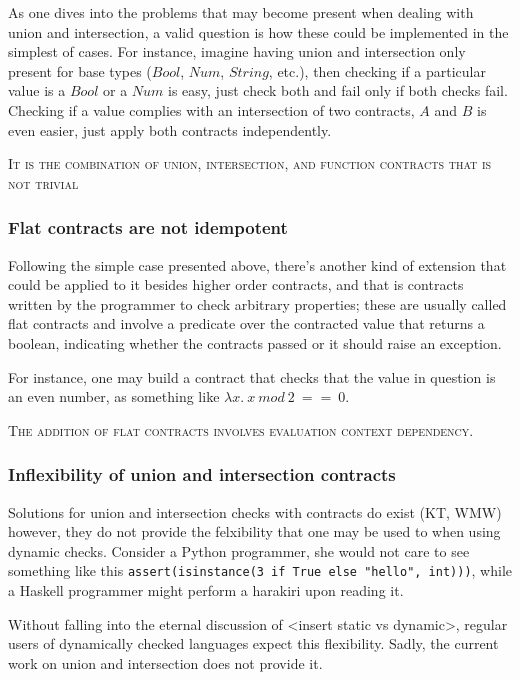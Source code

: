 As one dives into the problems that may become present when dealing with union and intersection,
a valid question is how these could be implemented in the simplest of cases.
For instance, imagine having
union and intersection only present for base types ($Bool$, $Num$, $String$, etc.), then checking
if a particular value is a $Bool$ or a $Num$ is easy, just check both and fail only if both 
checks fail. Checking if a value complies with an intersection of two contracts, $A$ and $B$ is even
easier, just apply both contracts independently.

\textsc{It is the combination of union, intersection, and function contracts that is not trivial}

\subsubsection*{Flat contracts are not idempotent}

Following the simple case presented above, there's another kind of extension that could be
applied to it besides higher order contracts, and that is contracts written by the
programmer to check arbitrary properties; these are usually called flat contracts and
involve a predicate over the contracted value that returns a boolean, indicating whether
the contracts passed or it should raise an exception.

For instance, one may build a contract that checks that the value in question is an
even number, as something like $\lambda x.~x~mod~2~==~0$.


\textsc{The addition of flat contracts involves evaluation context dependency.}

\subsubsection*{Inflexibility of union and intersection contracts}

Solutions for union and intersection checks with contracts do exist (KT, WMW) however,
they do not provide the felxibility that one may be used to when using dynamic checks.
Consider a Python programmer, she would not care to see something like this
\texttt{assert(isinstance(3 if True else "hello", int)))}, while a Haskell programmer
might perform a harakiri upon reading it.

Without falling into the eternal discussion of <insert static vs dynamic>,
regular users of dynamically checked languages expect this flexibility.
Sadly, the current work on union and intersection does not provide it.

